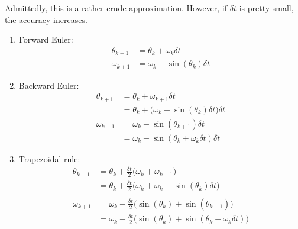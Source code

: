 \documentclass[a4paper,11pt]{report}
\begin{document}
\begin{enumerate}
    Admittedly, this is a rather crude approximation. However, if $\delta t$ is pretty
    small, the accuracy increases.

    \begin{enumerate}

    \item Forward Euler:
    \begin{equation*}
    \begin{aligned}
    \theta_{k+1} &= \theta_{k} + \omega_{k} \delta t \\
    \omega_{k+1} &= \omega_{k} - \sin(\theta_{k}) \delta t
    \end{aligned}
    \end{equation*}

    \vspace{1 cm}

    \item Backward Euler:
    \begin{equation*}
    \begin{aligned}
    \theta_{k+1} &= \theta_{k} + \omega_{k+1} \delta t \\
                 &= \theta_{k} + \Big( \omega_{k} - \sin(\theta_{k}) \delta t \Big) \delta t \\
    \omega_{k+1} &= \omega_{k} - \sin(\theta_{k+1}) \delta t \\
                 &= \omega_{k} - \sin(\theta_{k} + \omega_{k} \delta t) \delta t
    \end{aligned}
    \end{equation*}

    \vspace{1 cm}

    \item Trapezoidal rule:
    \begin{equation*}
    \begin{aligned}
    \theta_{k+1} &= \theta_{k} + \frac{\delta t}{2} \Big( \omega_{k} + \omega_{k+1} \Big) \\
                 &= \theta_{k} + \frac{\delta t}{2} \Big( \omega_{k} + \omega_{k} - \sin(\theta_{k}) \delta t \Big) \\ \\
    \omega_{k+1} &= \omega_{k} - \frac{\delta t}{2} \Big( \sin(\theta_{k}) + \sin(\theta_{k+1}) \Big) \\
                 &= \omega_{k} - \frac{\delta t}{2} \Big( \sin(\theta_{k}) + \sin(\theta_{k} + \omega_{k} \delta t) \Big)
    \end{aligned}
    \end{equation*}


\end{enumerate}
\end{enumerate}
\end{document}
